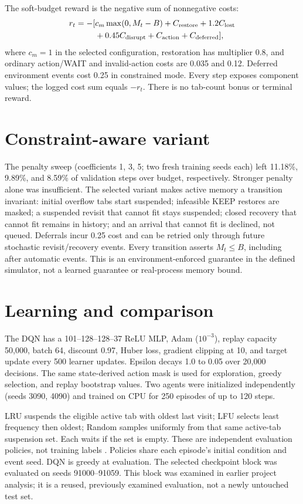 \documentclass[9pt,twocolumn]{article}
\begin{document}
The soft-budget reward is the negative sum of nonnegative costs:
\begin{align*}
r_t=-[&c_m\max(0,M_t-B)+C_{\rm restore}+1.2C_{\rm lost}\\
&+0.45C_{\rm disrupt}+C_{\rm action}+C_{\rm deferred}],
\end{align*}
where $c_m=1$ in the selected configuration, restoration has multiplier 0.8, and ordinary action/WAIT and invalid-action costs are 0.035 and 0.12. Deferred environment events cost 0.25 in constrained mode. Every step exposes component values; the logged cost sum equals $-r_t$. There is no tab-count bonus or terminal reward.

\section{Constraint-aware variant}
The penalty sweep (coefficients 1, 3, 5; two fresh training seeds each) left 11.18\%, 9.89\%, and 8.59\% of validation steps over budget, respectively. Stronger penalty alone was insufficient. The selected variant makes active memory a transition invariant: initial overflow tabs start suspended; infeasible KEEP restores are masked; a suspended revisit that cannot fit stays suspended; closed recovery that cannot fit remains in history; and an arrival that cannot fit is declined, not queued. Deferrals incur 0.25 cost and can be retried only through future stochastic revisit/recovery events. Every transition asserts $M_t\leq B$, including after automatic events. This is an environment-enforced guarantee in the defined simulator, not a learned guarantee or real-process memory bound.

\section{Learning and comparison}
The DQN has a 101--128--128--37 ReLU MLP, Adam ($10^{-3}$), replay capacity 50,000, batch 64, discount 0.97, Huber loss, gradient clipping at 10, and target update every 500 learner updates. Epsilon decays 1.0 to 0.05 over 20,000 decisions. The same state-derived action mask is used for exploration, greedy selection, and replay bootstrap values. Two agents were initialized independently (seeds 3090, 4090) and trained on CPU for 250 episodes of up to 120 steps.

LRU suspends the eligible active tab with oldest last visit; LFU selects least frequency then oldest; Random samples uniformly from that same active-tab suspension set. Each waits if the set is empty. These are independent evaluation policies, not training labels \cite{sutton}. Policies share each episode's initial condition and event seed. DQN is greedy at evaluation. The selected checkpoint block was evaluated on seeds 91000--91059. This block was examined in earlier project analysis; it is a reused, previously examined evaluation, not a newly untouched test set.
\end{document}
